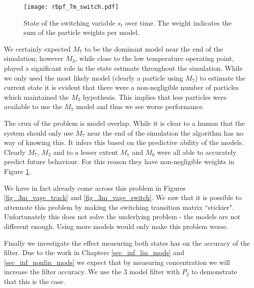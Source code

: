 \begin{figure}[H] 
\centering
\texttt{[image: rbpf\_7m\_switch.pdf]}
\caption{State of the switching variable $s_t$ over time. The weight indicates the sum of the particle weights per model.}
\label{fig_7m_switch}
\end{figure}
We certainly expected $M_7$ to be the dominant model near the end of the simulation; however $M_3$, while close to the low temperature operating point, played a significant role in the state estimate throughout the simulation. While we only used the most likely model (clearly a particle using $M_7$) to estimate the current state it is evident that there were a non-negligible number of particles which maintained the $M_3$ hypothesis. This implies that less particles were available to use the $M_7$ model and thus we see worse performance.

The crux of the problem is model overlap. While it is clear to a human that the system should only use $M_7$ near the end of the simulation the algorithm has no way of knowing this. It infers this based on the predictive ability of the models. Clearly $M_7$, $M_3$ and to a lesser extent $M_1$ and $M_6$ were all able to accurately predict future behaviour. For this reason they have non-negligible weights in Figure \ref{fig_7m_switch}. 

We have in fact already come across this problem in Figures \ref{fig_3m_vage_track} and \ref{fig_3m_vage_switch}. We saw that it is possible to attenuate this problem by making the switching transition matrix ``stickier". Unfortunately this does not solve the underlying problem - the models are not different enough. Using more models would only make this problem worse.

Finally we investigate the effect measuring both states has on the accuracy of the filter. Due to the work in Chapters \ref{sec_inf_lin_mods} and \ref{sec_inf_nonlin_mods} we expect that by measuring concentration we will increase the filter accuracy. We use the 3 model filter with $P_2$ to demonstrate that this is the case.

